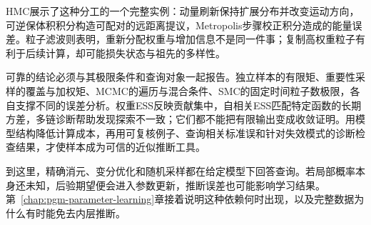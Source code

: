 HMC展示了这种分工的一个完整实例：动量刷新保持扩展分布并改变运动方向，可逆保体积积分构造可配对的远距离提议，Metropolis步骤校正积分造成的能量误差。粒子滤波则表明，重新分配权重与增加信息不是同一件事；复制高权重粒子有利于后续计算，却可能损失状态与祖先的多样性。

可靠的结论必须与其极限条件和查询对象一起报告。独立样本的有限矩、重要性采样的覆盖与加权矩、MCMC的遍历与混合条件、SMC的固定时间粒子数极限，各自支撑不同的误差分析。权重ESS反映贡献集中，自相关ESS匹配特定函数的长期方差，多链诊断帮助发现探索不一致；它们都不能把有限输出变成收敛证明。用模型结构降低计算成本，再用可复核例子、查询相关标准误和针对失效模式的诊断检查结果，才使样本成为可信的近似推断工具。

到这里，精确消元、变分优化和随机采样都在给定模型下回答查询。若局部概率本身还未知，后验期望便会进入参数更新，推断误差也可能影响学习结果。第~\ref{chap:pgm-parameter-learning}章接着说明这种依赖何时出现，以及完整数据为什么有时能免去内层推断。
